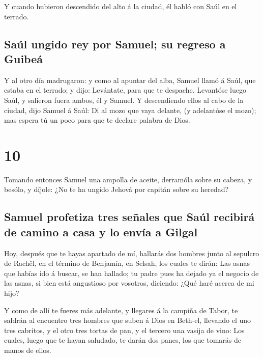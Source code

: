  Y cuando hubieron descendido del alto á la ciudad, él
habló con Saúl en el terrado.

\hypertarget{sauxfal-ungido-rey-por-samuel-su-regreso-a-guibeuxe1}{%
\subsection{Saúl ungido rey por Samuel; su regreso a
Guibeá}\label{sauxfal-ungido-rey-por-samuel-su-regreso-a-guibeuxe1}}

 Y al otro día madrugaron: y como al apuntar del alba,
Samuel llamó á Saúl, que estaba en el terrado; y dijo: Levántate, para
que te despache. Levantóse luego Saúl, y salieron fuera ambos, él y
Samuel.  Y descendiendo ellos al cabo de la ciudad, dijo
Samuel á Saúl: Di al mozo que vaya delante, (y adelantóse el mozo); mas
espera tú un poco para que te declare palabra de Dios.

\hypertarget{section-9}{%
\section{10}\label{section-9}}

 Tomando entonces Samuel una ampolla de aceite, derramóla
sobre su cabeza, y besólo, y díjole: ¿No te ha ungido Jehová por capitán
sobre su heredad?

\hypertarget{samuel-profetiza-tres-seuxf1ales-que-sauxfal-recibiruxe1-de-camino-a-casa-y-lo-envuxeda-a-gilgal}{%
\subsection{Samuel profetiza tres señales que Saúl recibirá de camino a
casa y lo envía a
Gilgal}\label{samuel-profetiza-tres-seuxf1ales-que-sauxfal-recibiruxe1-de-camino-a-casa-y-lo-envuxeda-a-gilgal}}

 Hoy, después que te hayas apartado de mí, hallarás dos
hombres junto al sepulcro de Rachêl, en el término de Benjamín, en
Selsah, los cuales te dirán: Las asnas que habías ido á buscar, se han
hallado; tu padre pues ha dejado ya el negocio de las asnas, si bien
está angustioso por vosotros, diciendo: ¿Qué haré acerca de mi hijo?

 Y como de allí te fueres más adelante, y llegares á la
campiña de Tabor, te saldrán al encuentro tres hombres que suben á Dios
en Beth-el, llevando el uno tres cabritos, y el otro tres tortas de pan,
y el tercero una vasija de vino:  Los cuales, luego que te
hayan saludado, te darán dos panes, los que tomarás de manos de ellos.

